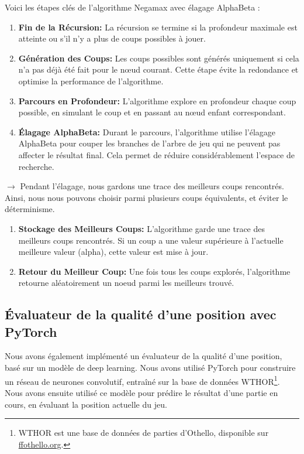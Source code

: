 Voici les étapes clés de l'algorithme Negamax avec élagage AlphaBeta :

\begin{enumerate}[label=\textbf{Étape \arabic*:}, wide, labelwidth=!, labelindent=0pt]
    \item \textbf{Fin de la Récursion:} La récursion se termine si la profondeur maximale est atteinte ou s'il n'y a plus de coups possibles à jouer.

    \item \textbf{Génération des Coups:} Les coups possibles sont générés uniquement si cela n'a pas déjà été fait pour le nœud courant. Cette étape évite la redondance et optimise la performance de l'algorithme.

    \item \textbf{Parcours en Profondeur:} L'algorithme explore en profondeur chaque coup possible, en simulant le coup et en passant au nœud enfant correspondant.

    \item \textbf{Élagage AlphaBeta:} Durant le parcours, l'algorithme utilise l'élagage AlphaBeta pour couper les branches de l'arbre de jeu qui ne peuvent pas affecter le résultat final. Cela permet de réduire considérablement l'espace de recherche.
\end{enumerate}
$\rightarrow$  Pendant l'élagage, nous gardons une trace des meilleurs coups rencontrés. Ainsi, nous nous pouvons choisir parmi plusieurs coups équivalents, et éviter le déterminisme.

\begin{enumerate}[resume, label=\textbf{Étape \arabic*:}, wide, labelwidth=!, labelindent=0pt]
    \item \textbf{Stockage des Meilleurs Coups:} L'algorithme garde une trace des meilleurs coups rencontrés. Si un coup a une valeur supérieure à l'actuelle meilleure valeur (alpha), cette valeur est mise à jour.

    \item \textbf{Retour du Meilleur Coup:} Une fois tous les coups explorés, l'algorithme retourne aléatoirement un noeud parmi les meilleurs trouvé.
\end{enumerate}


\subsection{Évaluateur de la qualité d'une position avec PyTorch}
\label{subsec:eval}
Nous avons également implémenté un évaluateur de la qualité d'une position, basé sur un modèle de deep learning. Nous avons utilisé PyTorch pour construire un réseau de neurones convolutif, entraîné sur la base de données WTHOR\footnote{WTHOR est une base de données de parties d'Othello, disponible sur \href{http://www.ffothello.org/informatique/la-base-wthor/}{ffothello.org}.}. Nous avons ensuite utilisé ce modèle pour prédire le résultat d'une partie en cours, en évaluant la position actuelle du jeu.

